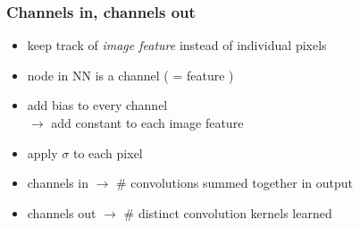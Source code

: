 \documentclass[aspectratio=169,14pt]{beamer}
\begin{document}
\begin{frame}
\frametitle{Channels in, channels out}
\begin{itemize}
    \item keep track of \emph{image feature} instead of individual pixels
    \item node in NN is a channel ( = feature )
    \item add bias to every channel \\\qquad\qquad$\rightarrow$ add constant to each image feature
    \item apply $\sigma$ to each pixel
    \item channels in $\rightarrow$ \# convolutions summed together in output
    \item channels out $\rightarrow$ \# distinct convolution kernels learned
\end{itemize}
\end{frame}
\end{document}
